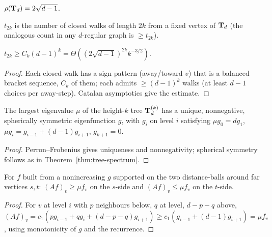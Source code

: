 \begin{definition}
  \label{def:spectral-radius-tree}
  $\rho(\mathbf{T}_d)=2\sqrt{d-1}$.
\end{definition}

\begin{definition}
  \label{def:tree-number}
  $t_{2k}$ is the number of closed walks of length $2k$ from a fixed vertex of
  $\mathbf{T}_d$ (the analogous count in any $d$-regular graph is $\ge t_{2k}$).
\end{definition}

\begin{lemma}
  \label{lem:tree-number-estimate}
  $t_{2k}\ge C_k(d-1)^k=\Theta((2\sqrt{d-1})^{2k}k^{-3/2})$.
\end{lemma}
\begin{proof}
  Each closed walk has a sign pattern (away/toward $v$) that is a balanced
  bracket sequence, $C_k$ of them; each admits $\ge(d-1)^k$ walks (at least
  $d-1$ choices per away-step). Catalan asymptotics give the estimate.
\end{proof}

\begin{claim}
  \label{claim:tree-eigenfunction}
  The largest eigenvalue $\mu$ of the height-$k$ tree $\mathbf{T}_d^{(k)}$ has a unique,
  nonnegative, spherically symmetric eigenfunction $g$, with $g_i$ on level $i$
  satisfying $\mu g_0=dg_1$, $\mu g_i=g_{i-1}+(d-1)g_{i+1}$, $g_{k+1}=0$.
\end{claim}
\begin{proof}
  Perron--Frobenius gives uniqueness and nonnegativity; spherical symmetry
  follows as in Theorem~\ref{thm:tree-spectrum}.
\end{proof}

\begin{lemma}
  \label{lem:test-function}
  For $f$ built from a nonincreasing $g$ supported on the two distance-balls
  around far vertices $s,t$: $(Af)_v\ge\mu f_v$ on the $s$-side and
  $(Af)_v\le\mu f_v$ on the $t$-side.
\end{lemma}
\begin{proof}
  For $v$ at level $i$ with $p$ neighbours below, $q$ at level, $d-p-q$ above,
  $(Af)_v=c_1(pg_{i-1}+qg_i+(d-p-q)g_{i+1})\ge c_1(g_{i-1}+(d-1)g_{i+1})=\mu f_v$,
  using monotonicity of $g$ and the recurrence.
\end{proof}

